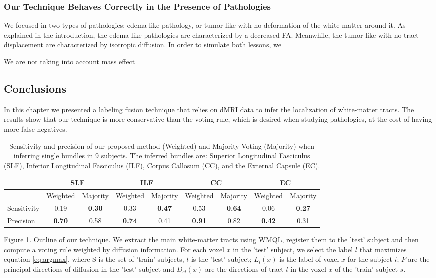 \subsubsection{Our Technique Behaves Correctly in the Presence of Pathologies}
We focused
in two types of pathologies: edema-like pathology, or tumor-like with no
deformation of the white-matter around it. As explained in the introduction, the
edema-like pathologies are characterized by a decreased FA. Meanwhile, the
tumor-like with no tract displacement are characterized by isotropic diffusion.
In order to simulate both lessons, we 


We are not taking into account mass effect



\subsection{Conclusions}
In this chapter we presented a labeling fusion technique that relies on dMRI
data to infer the localization of white-matter tracts. The results show that
our technique is more conservative than the voting rule, which is desired when
studying pathologies, at the cost of having more false negatives.


\begin{table}[]
    \label{table:sensitivity}
\centering
    \caption{Sensitivity and precision of our proposed
             method (Weighted) and Majority Voting (Majority) when inferring single
             bundles in 9 subjects. The inferred bundles are: Superior Longitudinal
             Fasciculus (SLF), Inferior Longitudinal Fasciculus (ILF), Corpus
             Callosum (CC), and the External Capsule (EC).}
\label{my-label}
\begin{tabular}{|l||c|c||c|c||c|c||c|c|}
\hline
 & \multicolumn{2}{c||}{SLF} & \multicolumn{2}{c||}{ILF} & \multicolumn{2}{|c||}{CC} & \multicolumn{2}{|c|}{EC}\\ 
 \hline
            &  Weighted & Majority & Weighted & Majority & Weighted & Majority & Weighted & Majority \\
  \hline
Sensitivity & 0.19      & \bf{0.30}   & 0.33      & \bf{0.47}   & 0.53      & \bf{0.64}   & 0.06      & \bf{0.27} \\
  \hline
Precision   & \bf{0.70}      & 0.58   & \bf{0.74}      & 0.41   & \bf{0.91}      & 0.82   & \bf{0.42}      & 0.31 \\
\hline
\end{tabular}
\end{table}

Figure 1. Outline of our technique. We extract the main white-matter tracts using WMQL, register them to the 'test' subject and then compute a voting rule weighted by diffusion information. For each voxel $x$ in the 'test' subject, we select the label $l$ that maximizes equation \ref{eq:argmax}, where S is the set of 'train' subjects, $t$ is the 'test' subject; $L_i(x)$ is the label of voxel $x$ for the subject $i$; $P$ are the principal directions of diffusion in the 'test' subject and $D_{sl}(x)$ are the directions of tract $l$ in the voxel $x$ of the 'train' subject $s$.

\chapterbib

